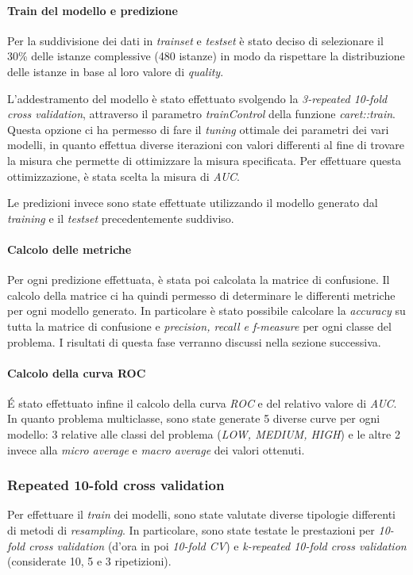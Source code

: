         \paragraph{Train del modello e predizione} 
        Per la suddivisione dei dati in \textit{trainset} e \textit{testset} è stato deciso di selezionare il 30\% delle istanze complessive (480 istanze) in modo da rispettare la distribuzione delle istanze in base al loro valore di \textit{quality}. 
        
        L'addestramento del modello è stato effettuato svolgendo la \textit{3-repeated 10-fold cross validation}, attraverso il parametro \textit{trainControl} della funzione \textit{caret::train}. Questa opzione ci ha permesso di fare il \textit{tuning} ottimale dei parametri dei vari modelli, in quanto effettua diverse iterazioni con valori differenti al fine di trovare la misura che permette di ottimizzare la misura specificata. Per effettuare questa ottimizzazione, è stata scelta la misura di \textit{AUC}.
        
        Le predizioni invece sono state effettuate utilizzando il modello generato dal \textit{training} e il \textit{testset} precedentemente suddiviso.
    
        \paragraph{Calcolo delle metriche} Per ogni predizione effettuata, è stata poi calcolata la matrice di confusione. Il calcolo della matrice ci ha quindi permesso di determinare le differenti metriche per ogni modello generato. In particolare è stato possibile calcolare la \textit{accuracy} su tutta la matrice di confusione e \textit{precision, recall e f-measure} per ogni classe del problema. I risultati di questa fase verranno discussi nella sezione successiva.

        \paragraph{Calcolo della curva ROC} \'E stato effettuato infine il calcolo della curva \textit{ROC} e del relativo valore di \textit{AUC}. In quanto problema multiclasse, sono state generate 5 diverse curve per ogni modello: 3 relative alle classi del problema (\textit{LOW, MEDIUM, HIGH}) e le altre 2 invece alla \textit{micro average} e \textit{macro average} dei valori ottenuti.
        
        \subsubsection{Repeated 10-fold cross validation}
        Per effettuare il \textit{train} dei modelli, sono state valutate diverse tipologie differenti di metodi di \textit{resampling}. In particolare, sono state testate le prestazioni per \textit{10-fold cross validation} (d'ora in poi \textit{10-fold CV}) e \textit{k-repeated 10-fold cross validation} (considerate 10, 5 e 3 ripetizioni).
        

